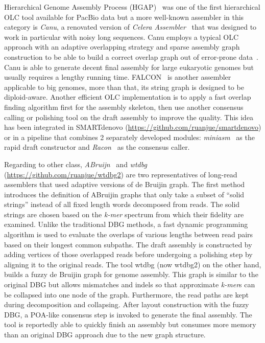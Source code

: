 Hierarchical Genome Assembly Process (HGAP)~\cite{ChinAM2013} was one of the first hierarchical OLC tool available for PacBio data but a more well-known assembler in this category is \emph{Canu}, a renovated version of \emph{Celera Assembler}~\cite{MyersSD2000} that was designed to work in particular with noisy long sequences. Canu employs a typical OLC approach with an adaptive overlapping strategy and sparse assembly graph construction to be able to build a correct overlap graph out of error-prone data~\cite{Koren2017canu}. Canu is able to generate decent final assembly for large eukaryotic genomes but usually requires a lengthy running time.
FALCON~\cite{Chin2016facon} is another assembler applicable to big genomes, more than that, its string graph is designed to be diploid-aware.
Another efficient OLC implementation is to apply a fast overlap finding algorithm first for the assembly skeleton, then use another consensus calling or polishing tool on the draft assembly to improve the quality. This idea has been integrated in SMARTdenovo (\url{https://github.com/ruanjue/smartdenovo}) or in a pipeline that combines 2 separately developed modules: \emph{miniasm}~\cite{Li2016} as the rapid draft constructor and \emph{Racon}~\cite{Vaser2017racon} as the consensus caller. 


Regarding to other class, \emph{ABruijn}~\cite{Lin2016abruijin} and \emph{wtdbg} (\url{https://github.com/ruanjue/wtdbg2}) are two representatives of long-read assemblers that used adaptive versions of de Bruijin graph.
The first method introduces the definition of ABruijin graphs that only take a subset of ``solid strings'' instead of all fixed length words decomposed from reads. The solid strings are chosen based on the \emph{k-mer} spectrum from which their fidelity are examined.
Unlike the traditional DBG methods, a fast dynamic programming algorithm is used to evaluate the overlaps of various lengths between read pairs based on their longest common subpaths. The draft assembly is constructed by adding vertices of those overlapped reads before undergoing a polishing step by aligning it to the original reads.
The tool wtdbg (now wtdbg2) on the other hand, builds a fuzzy de Bruijin graph for genome assembly. This graph is similar to the original DBG but allows mismatches and indels so that approximate \emph{k-mer}s can be collapsed into one node of the graph. Furthermore, the read paths are kept during decomposition and collapsing. After layout construction with the fuzzy DBG, a POA-like consensus step is invoked to generate the final assembly. 
The tool is reportedly able to quickly finish an assembly but consumes more memory than an original DBG approach due to the new graph structure. 

